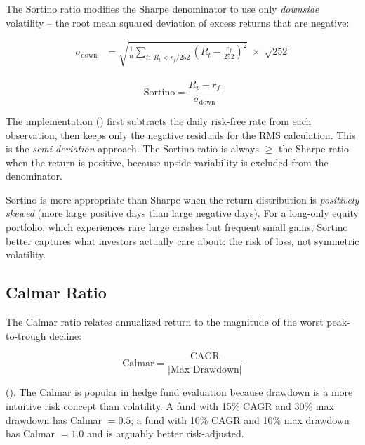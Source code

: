 The Sortino ratio modifies the Sharpe denominator to use only \emph{downside} volatility -- the root mean squared deviation of excess returns that are negative:

\begin{align}
  \sigma_{\text{down}} &= \sqrt{\frac{1}{n} \sum_{t:\; R_t < r_f/252} \!\!\left(R_t - \frac{r_f}{252}\right)^2} \;\times\; \sqrt{252}
  \label{eq:sortino-dd}
\end{align}

\begin{equation}
  \text{Sortino} = \frac{\bar{R}_p - r_f}{\sigma_{\text{down}}}
  \label{eq:sortino}
\end{equation}

The implementation () first subtracts the daily risk-free rate from each observation, then keeps only the negative residuals for the RMS calculation. This is the \emph{semi-deviation} approach. The Sortino ratio is always $\geq$ the Sharpe ratio when the return is positive, because upside variability is excluded from the denominator.

\begin{keyinsight}
  Sortino is more appropriate than Sharpe when the return distribution is \emph{positively skewed} (more large positive days than large negative days). For a long-only equity portfolio, which experiences rare large crashes but frequent small gains, Sortino better captures what investors actually care about: the risk of loss, not symmetric volatility.
\end{keyinsight}

\subsection{Calmar Ratio}

The Calmar ratio relates annualized return to the magnitude of the worst peak-to-trough decline:

\begin{equation}
  \text{Calmar} = \frac{\text{CAGR}}{|\text{Max Drawdown}|}
  \label{eq:calmar}
\end{equation}

(). The Calmar is popular in hedge fund evaluation because drawdown is a more intuitive risk concept than volatility. A fund with 15\% CAGR and 30\% max drawdown has Calmar $= 0.5$; a fund with 10\% CAGR and 10\% max drawdown has Calmar $= 1.0$ and is arguably better risk-adjusted.

